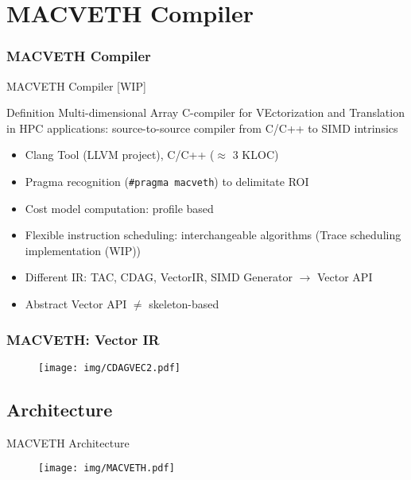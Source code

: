 \documentclass[xcolor=table,hideothersubsections,aspectratio=1610]{beamer}
\begin{document}





\section{MACVETH Compiler}
\frametitle{MACVETH Compiler}
\begin{frame}{MACVETH Compiler [WIP]}
    \begin{block}{Definition}
        Multi-dimensional Array C-compiler for VEctorization and Translation in HPC applications: source-to-source compiler from C/C++ to SIMD intrinsics
    \end{block}
    \begin{itemize}
        \item Clang Tool (LLVM project), C/C++ ($\approx$ 3 KLOC)
        \item Pragma recognition (\texttt{\#pragma macveth}) to delimitate ROI
        \item Cost model computation: profile based
        \item Flexible instruction scheduling: interchangeable algorithms (Trace scheduling implementation (WIP))
        \item Different IR: TAC, CDAG, VectorIR, SIMD Generator $\rightarrow$ Vector API
        \item Abstract Vector API $\neq$ skeleton-based
    \end{itemize}

\end{frame}

\begin{frame}[fragile]
    \frametitle{MACVETH: Vector IR}
    \begin{figure}
        \centering
        \texttt{[image: img/CDAGVEC2.pdf]}
    \end{figure}
\end{frame}


\subsection{Architecture}
\begin{frame}{MACVETH Architecture}
    \begin{figure}
        \centering
        \texttt{[image: img/MACVETH.pdf]}
    \end{figure}
\end{frame}
\end{document}
